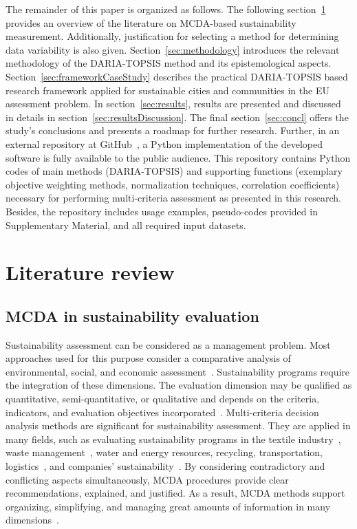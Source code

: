 \documentclass[5p,times]{elsarticle}
\newcounter{example}[section]
\begin{document}
The remainder of this paper is organized as follows. The following section~\ref{sec:litrev} provides an overview of the literature on MCDA-based sustainability measurement. Additionally, justification for selecting a method for determining data variability is also given. Section~\ref{sec:methodology} introduces the relevant methodology of the DARIA-TOPSIS method and its epistemological aspects. Section~\ref{sec:frameworkCaseStudy} describes the practical DARIA-TOPSIS based research framework applied for sustainable cities and communities in the EU assessment problem. In section~\ref{sec:results}, results are presented and discussed in details in section~\ref{sec:resultsDiscussion}. The final section~\ref{sec:concl} offers the study’s conclusions and presents a roadmap for further research. Further, in an external repository at GitHub~\cite{dariagithub2022}, a Python implementation of the developed software is fully available to the public audience. This repository contains Python codes of main methods (DARIA-TOPSIS) and supporting functions (exemplary objective weighting methods, normalization techniques, correlation coefficients) necessary for performing multi-criteria assessment as presented in this research. Besides, the repository includes usage examples, pseudo-codes provided in Supplementary Material, and all required input datasets.

\section{Literature review}
\label{sec:litrev}

\subsection{MCDA in sustainability evaluation}
Sustainability assessment can be considered as a management problem. Most approaches used for this purpose consider a comparative analysis of environmental, social, and economic assessment~\cite{rafiaani2018social}. Sustainability programs require the integration of these dimensions. The evaluation dimension may be qualified as quantitative, semi-quantitative, or qualitative and depends on the criteria, indicators, and evaluation objectives incorporated~\cite{deshpande2020multi}. Multi-criteria decision analysis methods are significant for sustainability assessment. They are applied in many fields, such as evaluating sustainability programs in the textile industry~\cite{lombardi2021multiple}, waste management~\cite{deshpande2020multi}, water and energy resources, recycling, transportation, logistics~\cite{colapinto2020environmental}, and companies' sustainability~\cite{myllyviita2017sustainability}. By considering contradictory and conflicting aspects simultaneously, MCDA procedures provide clear recommendations, explained, and justified. As a result, MCDA methods support organizing, simplifying, and managing great amounts of information in many dimensions~\cite{morfoulaki2021use}.
\end{document}
